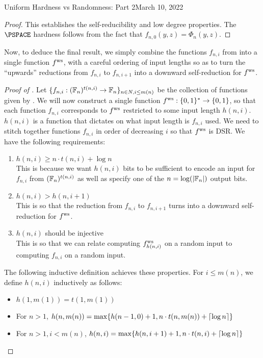 \begin{lecture}{8}{Uniform Hardness vs Randomness: Part 2}{March 10, 2022}
\begin{proof}
This establishes the self-reducibility and low degree properties. The $\PSPACE$ hardness follows from the fact that $f_{n,0}(y, z) = \Phi_n(y, z)$. 
\end{proof}

Now, to deduce the final result, we simply combine the functions $f_{n,i}$ from  into a single function $ f^{\text{ws}} $, with a careful ordering of input lengths so as to turn the ``upwards'' reductions from $f_{n,i}$ to $f_{n,i+1}$ into a downward self-reduction for $ f^{\text{ws}} $.


\begin{proof}[Proof of  ]
	Let $\{f_{n,i} : (\mathbb{F}_n)^{t(n,i)} \rightarrow \mathbb{F}_n\}_{n \in N,i \leq m(n)}$ be the collection of functions given by . We will now construct a single function $ f^{\text{ws}}  : \{0, 1\}^* \rightarrow \{0, 1\}$, so that each function $f_{n,i}$ corresponds to $ f^{\text{ws}} $ restricted to some input length $h(n, i)$. $h(n,i)$ is a function that dictates on what input length is $f_{n,i}$ used.
	We need to stitch together functions $f_{n,i}$ in order of decreasing $i$ so that $ f^{\text{ws}} $ is DSR. We have the following requirements:
	\begin{enumerate}
		\item $h(n, i) \geq n \cdot t(n, i) + \log n$ \\
		This is because we want $h(n, i)$ bits to be sufficient to encode an input for $f_{n,i}$ from $(\mathbb{F}_n)^{t(n,i)}$ as well as specify one of the $n = \log (\lvert\mathbb{F}_n\rvert)$ output bits.
		\item $h(n, i) > h(n, i + 1)$ \\
		This is so that the reduction from $f_{n,i}$ to $f_{n,i+1}$ turns into a downward self-reduction for $ f^{\text{ws}} $.
		\item $h(n,i)$ should be injective \\
		This is so that we can relate computing $ f^{\text{ws}} _{h(n,i)}$ on a random input to computing $f_{n,i}$ on a random input. 
	\end{enumerate}
	The following inductive definition achieves these properties. For $i \leq m(n)$, we define $h(n, i)$ inductively as follows:
	\begin{itemize}
		\item $h(1, m(1)) = t(1, m(1))$
		\item For $n > 1$, $h(n, m(n)) = \max \{h(n - 1, 0) + 1, n \cdot t(n, m(n)) + \lceil\log n\rceil\}$
		\item For $n > 1, i < m(n)$, $h(n, i) = \max \{h(n, i + 1) + 1, n \cdot t(n, i) + \lceil\log n\rceil \}$

\end{itemize}
\end{proof}
\end{lecture}
